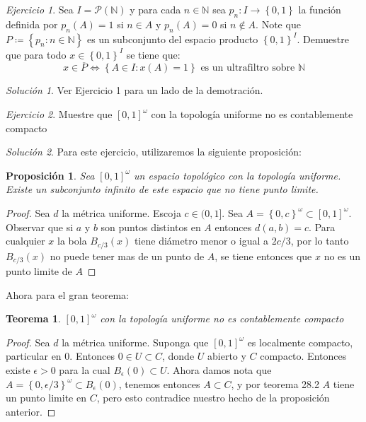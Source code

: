 \documentclass[notitlepage]{report}
\newtheorem{thm}{Teorema}
\newtheorem{prop}{Proposición}
\theoremstyle{definition}
\theoremstyle{remark}
\newtheorem{exc}{Ejercicio}
\newtheorem*{sol}{Solución}
\newcommand{\set}[1]{\left\lbrace #1 \right\rbrace}
\newcommand{\NN}{\mathbb{N}}
\begin{document}
\begin{exc}
	Sea $ I = \mathcal{P}(\NN) $ y para cada $ n \in \NN $ sea $ p_n: I \rightarrow \set{0,1} $ la función definida por $ p_n(A) = 1 $ si $ n \in A $ y $ p_n(A) = 0 $ si $ n \not\in A $. Note que $ P \coloneqq  \set{p_n : n \in \NN} $ es un subconjunto del espacio producto $ \set{0,1}^I $. Demuestre que para todo $ x \in \set{0,1}^I $ se tiene que:
	\[ x \in \overline{P} \iff \set{A \in I : x(A) = 1} \textrm{ es un ultrafiltro sobre } \NN\]
\end{exc}
\begin{sol}
	Ver Ejercicio 1 para un lado de la demotración.
\end{sol}
\begin{exc}
	Muestre que $ [0,1]^\omega $ con la topología uniforme no es contablemente compacto
\end{exc}
\begin{sol}
	Para este ejercicio, utilizaremos la siguiente proposición:
	\begin{prop}
		Sea $ [0,1]^\omega $ un espacio topológico con la topología uniforme. Existe un subconjunto infinito de este espacio que no tiene punto limite.
	\end{prop}
	\begin{proof}
		Sea $ d $ la métrica uniforme. Escoja $ c \in (0,1] $. Sea $ A = \set{0,c}^\omega \subset [0,1]^\omega $. Observar que si $ a $ y $ b $ son puntos distintos en $ A $ entonces $ d(a,b) = c $. Para cualquier $ x $ la bola $ B_{c/3}(x) $ tiene diámetro menor o igual a $ 2c/3 $, por lo tanto $ B_{c/3}(x) $ no puede tener mas de un punto de $ A $, se tiene entonces que $ x $ no es un punto limite de $ A $
	\end{proof}
	Ahora para el gran teorema:
	\begin{thm}
		 $ [0,1]^\omega $ con la topología uniforme no es contablemente compacto
	\end{thm}
	\begin{proof}
		Sea $ d $ la métrica uniforme. Suponga que $ [0,1]^\omega $  es localmente compacto, particular en $ 0 $. Entonces $ 0 \in U \subset C $, donde $ U $ abierto y $ C $ compacto. Entonces existe $ \epsilon > 0 $ para la cual $ B_\epsilon (0) \subset U $. Ahora damos nota que $ A = \set{0, \epsilon/3}^\omega \subset B_\epsilon(0) $, tenemos entonces $ A \subset C $, y por teorema 28.2 $ A $ tiene un punto limite en $ C $, pero esto contradice nuestro hecho de la proposición anterior.
	\end{proof}
\end{sol}
\end{document}
